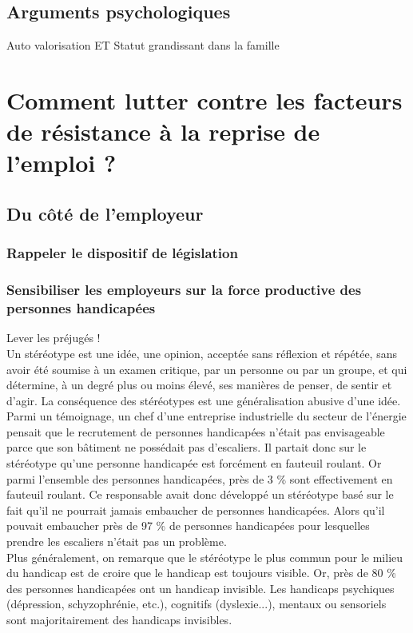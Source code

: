 \subsection{Arguments psychologiques}
Auto valorisation ET Statut grandissant dans la famille


\section{Comment lutter contre les facteurs de résistance à la reprise de l'emploi ?}

\subsection{Du c\^oté de l'employeur}

\subsubsection{Rappeler le dispositif de législation}

\subsubsection{Sensibiliser les employeurs sur la force productive des personnes handicapées}

Lever les préjugés !\\

Un stéréotype est une idée, une opinion, acceptée sans réflexion et répétée, sans avoir été soumise à un examen critique, par un personne ou par un groupe, et qui détermine, à un degré plus ou moins élevé, ses manières de penser, de sentir et d'agir.
La conséquence des stéréotypes est une généralisation abusive d'une idée. 
Parmi un témoignage, un chef d'une entreprise industrielle du secteur de l'énergie pensait que le recrutement de personnes handicapées n'était pas envisageable parce que son bâtiment ne possédait pas d'escaliers. Il partait donc sur le stéréotype qu'une personne handicapée est forcément en fauteuil roulant. Or parmi l'ensemble des personnes handicapées, près de 3 \% sont effectivement en fauteuil roulant. Ce responsable avait donc développé un stéréotype basé sur le fait qu'il ne pourrait jamais embaucher de personnes handicapées. Alors qu'il pouvait embaucher près de 97 \% de personnes handicapées pour lesquelles prendre les escaliers n'était pas un problème.\\

Plus généralement, on remarque que le stéréotype le plus commun pour le milieu du handicap est de croire que le handicap est toujours visible. Or, près de 80 \% des personnes handicapées ont un handicap invisible. Les handicaps psychiques (dépression, schyzophrénie, etc.), cognitifs (dyslexie...), mentaux ou sensoriels sont majoritairement des handicaps invisibles.\\

